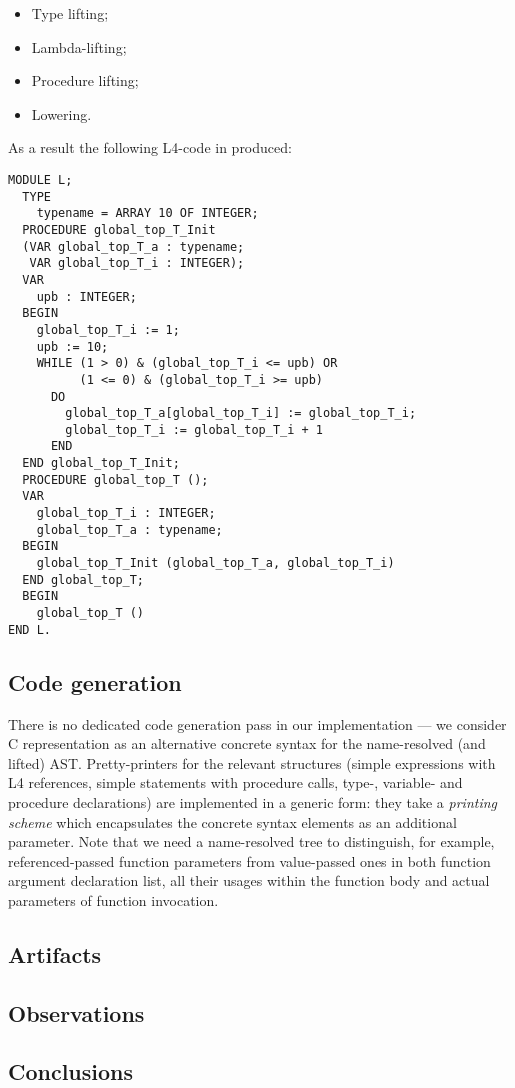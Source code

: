 \begin{itemize}
\item Type lifting;
\item Lambda-lifting;
\item Procedure lifting;
\item Lowering.
\end{itemize}

As a result the following L4-code in produced:

\begin{lstlisting}[language=oberon0]
MODULE L;
  TYPE
    typename = ARRAY 10 OF INTEGER;
  PROCEDURE global_top_T_Init 
  (VAR global_top_T_a : typename; 
   VAR global_top_T_i : INTEGER);
  VAR
    upb : INTEGER;
  BEGIN
    global_top_T_i := 1; 
    upb := 10; 
    WHILE (1 > 0) & (global_top_T_i <= upb) OR 
          (1 <= 0) & (global_top_T_i >= upb)
      DO
        global_top_T_a[global_top_T_i] := global_top_T_i; 
        global_top_T_i := global_top_T_i + 1
      END
  END global_top_T_Init;
  PROCEDURE global_top_T ();
  VAR
    global_top_T_i : INTEGER;
    global_top_T_a : typename;
  BEGIN
    global_top_T_Init (global_top_T_a, global_top_T_i)
  END global_top_T;
  BEGIN
    global_top_T ()
END L.
\end{lstlisting}

\subsection{Code generation}

There is no dedicated code generation pass in our implementation --- we consider C representation
as an alternative concrete syntax for the name-resolved (and lifted) AST. Pretty-printers for the relevant
structures (simple expressions with L4 references, simple statements with procedure calls, 
type-, variable- and procedure declarations) are implemented in a generic form: they take a
\emph{printing scheme} which encapsulates the concrete syntax elements as an additional
parameter. Note that we need a name-resolved tree to distinguish, for example, referenced-passed
function parameters from value-passed ones in both function argument declaration list, all
their usages within the function body and actual parameters of function invocation.

\subsection{Artifacts}

\subsection{Observations}

\subsection{Conclusions}

